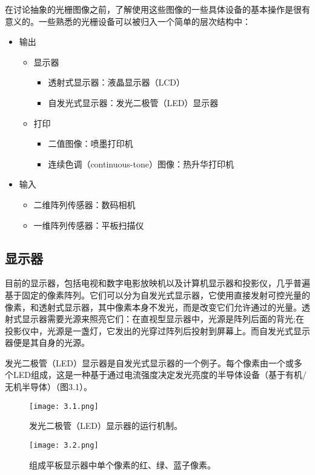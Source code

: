 \documentclass[lang=cn,12pt]{elegantbook}
\begin{document}
在讨论抽象的光栅图像之前，了解使用这些图像的一些具体设备的基本操作是很有意义的。一些熟悉的光栅设备可以被归入一个简单的层次结构中：

\begin{itemize}
  \item 输出
\begin{itemize}
  \item 显示器
\begin{itemize}
  \item 透射式显示器：液晶显示器（LCD）
  \item 自发光式显示器：发光二极管（LED）显示器
\end{itemize}
  \item 打印
\begin{itemize}
  \item 二值图像：喷墨打印机
  \item 连续色调（continuous-tone）图像：热升华打印机
\end{itemize}
\end{itemize}
  \item 输入
\begin{itemize}
  \item 二维阵列传感器：数码相机
  \item 一维阵列传感器：平板扫描仪
\end{itemize}
\end{itemize}

\subsection{显示器}

目前的显示器，包括电视和数字电影放映机以及计算机显示器和投影仪，几乎普遍基于固定的像素阵列。它们可以分为自发光式显示器，它使用直接发射可控光量的像素，和透射式显示器，其中像素本身不发光，而是改变它们允许通过的光量。透射式显示器需要光源来照亮它们：在直视型显示器中，光源是阵列后面的背光;在投影仪中，光源是一盏灯，它发出的光穿过阵列后投射到屏幕上。而自发光式显示器便是其自身的光源。

发光二极管（LED）显示器是自发光式显示器的一个例子。每个像素由一个或多个LED组成，这是一种基于通过电流强度决定发光亮度的半导体设备（基于有机/无机半导体）（图3.1）。

\begin{figure}[htb]
\centering
\begin{minipage}[t]{0.45\textwidth}
\centering
\texttt{[image: 3.1.png]}
\caption{发光二极管（LED）显示器的运行机制。}
\end{minipage}
\begin{minipage}[t]{0.45\textwidth}
\centering
\texttt{[image: 3.2.png]}
\caption{组成平板显示器中单个像素的红、绿、蓝子像素。}
\end{minipage}
\end{figure}
\end{document}
